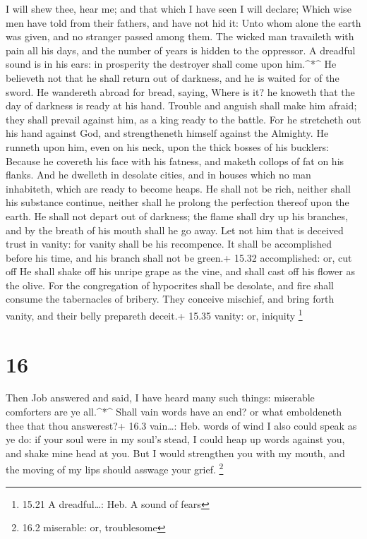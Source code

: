  I will shew thee, hear me; and that which I have seen I
will declare;  Which wise men have told from their fathers,
and have not hid it:  Unto whom alone the earth was given,
and no stranger passed among them.  The wicked man
travaileth with pain all his days, and the number of years is hidden to
the oppressor.  A dreadful sound is in his ears: in
prosperity the destroyer shall come upon him.\^{}*\^{}  He
believeth not that he shall return out of darkness, and he is waited for
of the sword.  He wandereth abroad for bread, saying, Where
is it? he knoweth that the day of darkness is ready at his hand.
 Trouble and anguish shall make him afraid; they shall
prevail against him, as a king ready to the battle.  For he
stretcheth out his hand against God, and strengtheneth himself against
the Almighty.  He runneth upon him, even on his neck, upon
the thick bosses of his bucklers:  Because he covereth his
face with his fatness, and maketh collops of fat on his flanks.
 And he dwelleth in desolate cities, and in houses which no
man inhabiteth, which are ready to become heaps.  He shall
not be rich, neither shall his substance continue, neither shall he
prolong the perfection thereof upon the earth.  He shall
not depart out of darkness; the flame shall dry up his branches, and by
the breath of his mouth shall he go away.  Let not him that
is deceived trust in vanity: for vanity shall be his recompence.
 It shall be accomplished before his time, and his branch
shall not be green.+ 15.32 accomplished: or, cut off  He
shall shake off his unripe grape as the vine, and shall cast off his
flower as the olive.  For the congregation of hypocrites
shall be desolate, and fire shall consume the tabernacles of bribery.
 They conceive mischief, and bring forth vanity, and their
belly prepareth deceit.+ 15.35 vanity: or, iniquity \footnote{15.21 A
  dreadful\ldots: Heb. A sound of fears}

\hypertarget{section-15}{%
\section{16}\label{section-15}}

 Then Job answered and said,  I have heard many
such things: miserable comforters are ye all.\^{}*\^{} 
Shall vain words have an end? or what emboldeneth thee that thou
answerest?+ 16.3 vain\ldots: Heb. words of wind  I also
could speak as ye do: if your soul were in my soul's stead, I could heap
up words against you, and shake mine head at you.  But I
would strengthen you with my mouth, and the moving of my lips should
asswage your grief. \footnote{16.2 miserable: or, troublesome}

